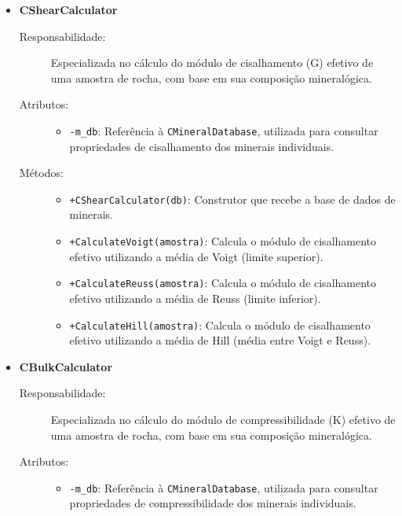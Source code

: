\begin{itemize}
    \item \textbf{CShearCalculator}
    \begin{description}
        \item[Responsabilidade:] Especializada no cálculo do módulo de cisalhamento (G) efetivo de uma amostra de rocha, com base em sua composição mineralógica.
        
        \item[Atributos:] 
        \begin{itemize}
            \item \texttt{-m\_db}: Referência à \texttt{CMineralDatabase}, utilizada para consultar propriedades de cisalhamento dos minerais individuais.
        \end{itemize}
        
        \item[Métodos:]
        \begin{itemize}
            \item \texttt{+CShearCalculator(db)}: Construtor que recebe a base de dados de minerais.
            \item \texttt{+CalculateVoigt(amostra)}: Calcula o módulo de cisalhamento efetivo utilizando a média de Voigt (limite superior).
            \item \texttt{+CalculateReuss(amostra)}: Calcula o módulo de cisalhamento efetivo utilizando a média de Reuss (limite inferior).
            \item \texttt{+CalculateHill(amostra)}: Calcula o módulo de cisalhamento efetivo utilizando a média de Hill (média entre Voigt e Reuss).
        \end{itemize}
    \end{description}

    \item \textbf{CBulkCalculator}
    \begin{description}
        \item[Responsabilidade:] Especializada no cálculo do módulo de compressibilidade (K) efetivo de uma amostra de rocha, com base em sua composição mineralógica.
        
        \item[Atributos:] 
        \begin{itemize}
            \item \texttt{-m\_db}: Referência à \texttt{CMineralDatabase}, utilizada para consultar propriedades de compressibilidade dos minerais individuais.
        \end{itemize}
        

\end{description}
\end{itemize}

